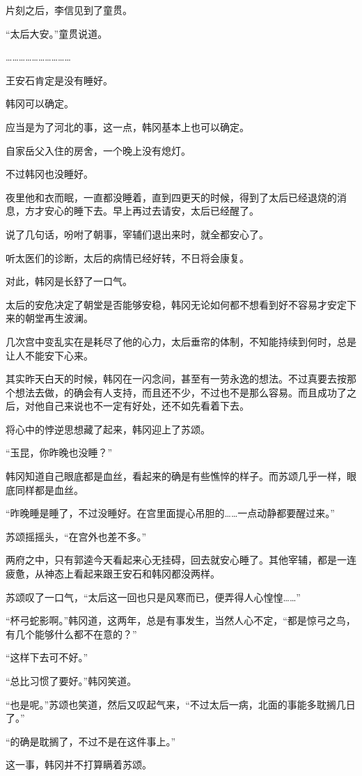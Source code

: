 片刻之后，李信见到了童贯。

“太后大安。”童贯说道。

…………………………

王安石肯定是没有睡好。

韩冈可以确定。

应当是为了河北的事，这一点，韩冈基本上也可以确定。

自家岳父入住的房舍，一个晚上没有熄灯。

不过韩冈也没睡好。

夜里他和衣而眠，一直都没睡着，直到四更天的时候，得到了太后已经退烧的消息，方才安心的睡下去。早上再过去请安，太后已经醒了。

说了几句话，吩咐了朝事，宰辅们退出来时，就全都安心了。

听太医们的诊断，太后的病情已经好转，不日将会康复。

对此，韩冈是长舒了一口气。

太后的安危决定了朝堂是否能够安稳，韩冈无论如何都不想看到好不容易才安定下来的朝堂再生波澜。

几次宫中变乱实在是耗尽了他的心力，太后垂帘的体制，不知能持续到何时，总是让人不能安下心来。

其实昨天白天的时候，韩冈在一闪念间，甚至有一劳永逸的想法。不过真要去按那个想法去做，的确会有人支持，而且还不少，不过也不是那么容易。而且成功了之后，对他自己来说也不一定有好处，还不如先看着下去。

将心中的悖逆思想藏了起来，韩冈迎上了苏颂。

“玉昆，你昨晚也没睡？”

韩冈知道自己眼底都是血丝，看起来的确是有些憔悴的样子。而苏颂几乎一样，眼底同样都是血丝。

“昨晚睡是睡了，不过没睡好。在宫里面提心吊胆的……一点动静都要醒过来。”

苏颂摇摇头，“在宫外也差不多。”

两府之中，只有郭逵今天看起来心无挂碍，回去就安心睡了。其他宰辅，都是一连疲惫，从神态上看起来跟王安石和韩冈都没两样。

苏颂叹了一口气，“太后这一回也只是风寒而已，便弄得人心惶惶……”

“杯弓蛇影啊。”韩冈道，这两年，总是有事发生，当然人心不定，“都是惊弓之鸟，有几个能够什么都不在意的？”

“这样下去可不好。”

“总比习惯了要好。”韩冈笑道。

“也是呢。”苏颂也笑道，然后又叹起气来，“不过太后一病，北面的事能多耽搁几日了。”

“的确是耽搁了，不过不是在这件事上。”

这一事，韩冈并不打算瞒着苏颂。
